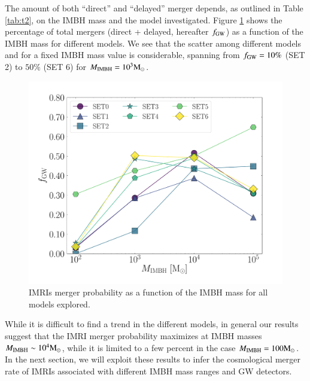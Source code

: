 \documentclass[article]{aa}
\newcommand{\Ms}{{\rm M}_\odot}
\newcommand{\ibh}{{\rm IMBH}}
\begin{document}
{\bf 

The amount of both ``direct'' and ``delayed'' merger depends, as outlined in Table \ref{tab:t2}, on the IMBH mass and the model investigated. Figure \ref{fig:gwprob} shows the percentage of total mergers (direct + delayed, hereafter $f_{\rm GW}$) as a function of the IMBH mass for different models. We see that the scatter among different models and for a fixed IMBH mass value is considerable, spanning from $f_{\rm GW} = 10\%$ (SET 2) to $50 \%$ (SET 6) for $M_\ibh = 10^3\Ms$. 
\begin{figure}
\includegraphics[width=\columnwidth]{mergerprob}
    \caption{IMRIs merger probability as a function of the IMBH mass for all models explored.}
	\label{fig:gwprob}
\end{figure}

While it is difficult to find a trend in the different models, in general our results suggest that the IMRI merger probability maximizes at IMBH masses $M_\ibh\sim 10^4\Ms$, while it is limited to a few percent in the case $M_{\ibh} = 100\Ms$. In the next section, we will exploit these results to infer the cosmological merger rate of IMRIs associated with different IMBH mass ranges and GW detectors.

}
\end{document}
